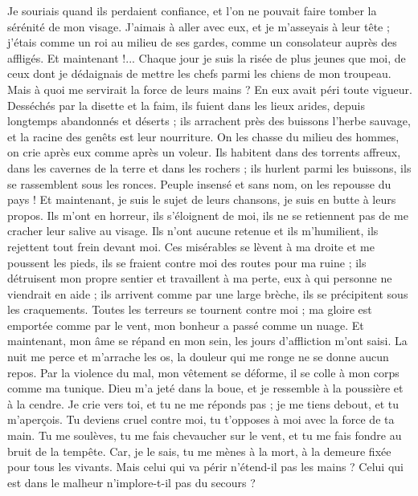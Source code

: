 \begin{multicols}{2}
Je souriais quand ils perdaient confiance, et l'on ne pouvait faire tomber la sérénité de mon visage.
J'aimais à aller avec eux, et je m'asseyais à leur tête ; j'étais comme un roi au milieu de ses gardes, comme un consolateur auprès des affligés.
\VerseOne{}Et maintenant !... Chaque jour je suis la risée de plus jeunes que moi, de ceux dont je dédaignais de  mettre les chefs parmi les chiens de mon troupeau.
Mais à quoi me servirait la force de leurs mains ? En eux avait péri toute vigueur.
Desséchés par la disette et la faim, ils fuient dans les lieux arides, depuis longtemps abandonnés et déserts ;
ils arrachent près des buissons l'herbe sauvage, et la racine des genêts est leur nourriture.
On les chasse du milieu des hommes, on crie après eux comme après un voleur.
Ils habitent dans des torrents affreux, dans les cavernes de la terre et dans les rochers ;
ils hurlent parmi les buissons, ils se rassemblent sous les ronces.
Peuple insensé et sans nom, on les repousse du pays !
Et maintenant, je suis le sujet de leurs chansons, je suis en butte à leurs propos.
Ils m'ont en horreur, ils s'éloignent de moi, ils ne se retiennent pas de me cracher leur salive au visage.
Ils n'ont aucune retenue et ils m'humilient, ils rejettent tout frein devant moi.
Ces misérables se lèvent à ma droite et me poussent les pieds, ils se fraient contre moi des routes pour ma ruine ;
ils détruisent mon propre sentier et travaillent à ma perte, eux à qui personne ne viendrait en aide ;
ils arrivent comme par une large brèche, ils se précipitent sous les craquements.
Toutes les terreurs se tournent contre moi ; ma gloire est emportée comme par le vent, mon bonheur a passé comme un nuage.
Et maintenant, mon âme se répand en mon sein, les jours d'affliction m'ont saisi.
La nuit me perce et m'arrache les os, la douleur qui me ronge ne se donne aucun repos.
Par la violence du mal, mon vêtement se déforme, il se colle à mon corps comme ma tunique.
Dieu m'a jeté dans la boue, et je ressemble à la poussière et à la cendre.
Je crie vers toi, et tu ne me réponds pas ; je me tiens debout, et tu m'aperçois.
Tu deviens cruel contre moi, tu t'opposes à moi avec la force de ta main.
Tu me soulèves, tu me fais chevaucher sur le vent, et tu me fais fondre au bruit de la tempête.
Car, je le sais, tu me mènes à la mort, à la demeure fixée pour tous les vivants.
Mais celui qui va périr n'étend-il pas les mains ? Celui qui est dans le malheur n'implore-t-il pas du secours ?

\end{multicols}
